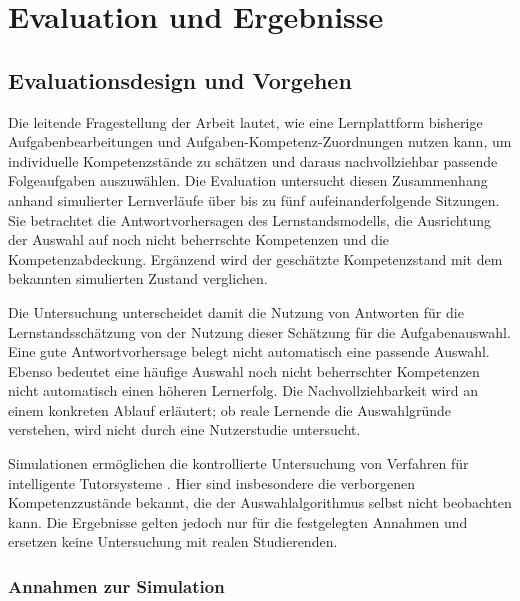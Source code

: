 

\chapter{Evaluation und Ergebnisse}
\label{chap:evaluation}

\section{Evaluationsdesign und Vorgehen}
\label{sec:evaluationsdesign}

Die leitende Fragestellung der Arbeit lautet, wie eine Lernplattform bisherige
Aufgabenbearbeitungen und Aufgaben-Kompetenz-Zuordnungen nutzen kann, um
individuelle Kompetenzstände zu schätzen und daraus nachvollziehbar passende
Folgeaufgaben auszuwählen. Die Evaluation untersucht diesen Zusammenhang anhand
simulierter Lernverläufe über bis zu fünf aufeinanderfolgende Sitzungen. Sie
betrachtet die Antwortvorhersagen des Lernstandsmodells, die Ausrichtung der
Auswahl auf noch nicht beherrschte Kompetenzen und die Kompetenzabdeckung.
Ergänzend wird der geschätzte Kompetenzstand mit dem bekannten simulierten
Zustand verglichen.

Die Untersuchung unterscheidet damit die Nutzung von Antworten für die
Lernstands\-schätzung von der Nutzung dieser Schätzung für die Aufgabenauswahl.
Eine gute Antwortvorhersage belegt nicht automatisch eine passende Auswahl.
Ebenso bedeutet eine häufige Auswahl noch nicht beherrschter Kompetenzen
nicht automatisch einen höheren Lernerfolg. Die Nachvollziehbarkeit wird an
einem konkreten Ablauf erläutert; ob reale Lernende die Auswahlgründe verstehen,
wird nicht durch eine Nutzerstudie untersucht.

Simulationen ermöglichen die kontrollierte Untersuchung von Verfahren für
intelligente Tutorsysteme \cite{vanlehn1994applications}. Hier sind insbesondere
die verborgenen Kompetenzzustände bekannt, die der Auswahlalgorithmus selbst
nicht beobachten kann. Die Ergebnisse gelten jedoch nur für die festgelegten
Annahmen und ersetzen keine Untersuchung mit realen Studierenden.

\subsection{Annahmen zur Simulation}

